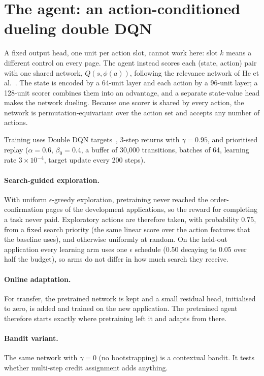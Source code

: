 \section{The agent: an action-conditioned dueling double DQN}
\label{sec:v1-agent}

A fixed output head, one unit per action slot, cannot work here: slot $k$ means a different
control on every page. The agent instead scores each (state, action) pair with one shared
network, $Q(s, \phi(a))$, following the relevance network of He et al.~\cite{he2016drrn}.
The state is encoded by a 64-unit layer and each action by a 96-unit layer; a 128-unit scorer
combines them into an advantage, and a separate state-value head makes the network
dueling. Because one scorer is shared by every action, the network is
permutation-equivariant over the action set and accepts any number of actions.

Training uses Double DQN targets~\cite{vanhasselt2016double}, 3-step
returns with $\gamma = 0.95$, and prioritised
replay ($\alpha = 0.6$, $\beta_0 = 0.4$, a buffer of 30{,}000
transitions, batches of 64, learning rate $3\times10^{-4}$, target update every 200 steps).

\paragraph{Search-guided exploration.} With uniform $\epsilon$-greedy exploration,
pretraining never reached the order-confirmation pages of the development applications, so
the reward for completing a task never paid. Exploratory actions are therefore taken, with
probability 0.75, from a fixed search priority (the same linear score over the action
features that the  baseline uses), and otherwise uniformly at random. On the held-out application every learning arm
uses one $\epsilon$ schedule (0.50 decaying to 0.05 over half the budget), so arms do not
differ in how much search they receive.

\paragraph{Online adaptation.} For transfer, the pretrained network is kept and a small
residual head, initialised to zero, is added and trained on the new application. The
pretrained agent therefore starts exactly where pretraining left it and adapts from there.

\paragraph{Bandit variant.} The same network with $\gamma = 0$ (no bootstrapping) is a
contextual bandit. It tests whether multi-step credit assignment adds anything.

